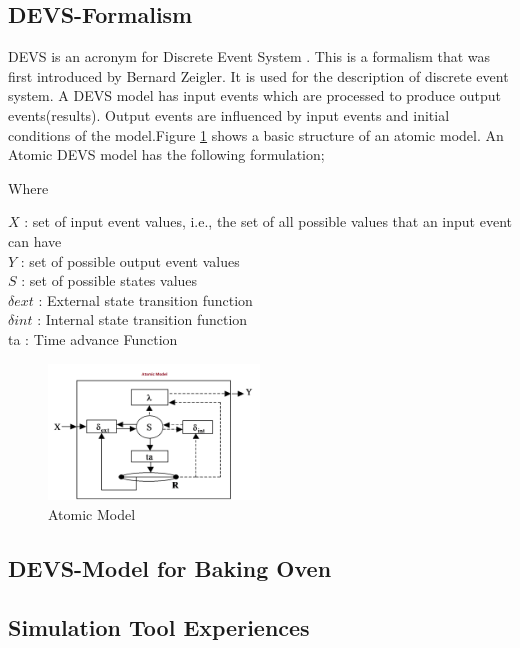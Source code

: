 \documentclass[titlepage]{article}%
\begin{document}
{\subsection{DEVS-Formalism}

DEVS is an acronym for Discrete Event System . This is a formalism that was first introduced by Bernard Zeigler. It is used for the description of discrete event system.  A DEVS model has input events which are processed to produce output events(results). Output events are influenced by  input events and  initial conditions of the model.Figure \ref{atomic_model} shows a basic structure of an atomic model.  An Atomic DEVS model has the following formulation;

Where

$X$ 		: set of input event values, i.e., the set of all possible values that an input event can have \\
$Y$ 		: set of possible output event values \\
$S$ 		: set of possible states values \\
$\delta ext$ 	: External state transition function \\
$\delta int$ 	: Internal state transition function \\
ta	  	: Time advance  Function \\

\begin{figure}[ht!]
  \centering
    \includegraphics[width=0.5\textwidth]{Fig1.png}
    \caption{Atomic Model}
    \label{atomic_model}
\end{figure}


\subsection{DEVS-Model for Baking Oven}
\subsection{Simulation Tool Experiences}


}
\end{document}
